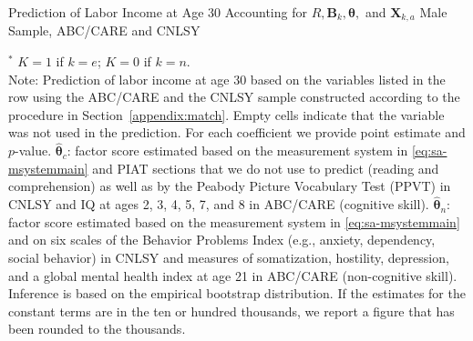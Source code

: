 \begin{table}
\begin{threeparttable}
\caption{Prediction of Labor Income at Age 30 Accounting for $R, \bm{B}_k, \bm{\theta},$ and $\bm{X}_{k,a}$ Male Sample, ABC/CARE and CNLSY}
\label{table:end2}
\centering
\scriptsize

\begin{tablenotes}
\footnotesize
\item $^\ast$ $K=1$ if $k=e$; $K=0$ if $k=n$.\\
Note: Prediction of labor income at age 30 based on the variables listed in the row using the ABC/CARE and the CNLSY sample constructed according to the procedure in Section~\ref{appendix:match}. Empty cells indicate that the variable was not used in the prediction. For each coefficient we provide point estimate and $p$-value. $\hat{\bm{\theta}}_{c}$: factor score estimated based on the measurement system in \eqref{eq:sa-msystemmain} and PIAT sections that we do not use to predict (reading and comprehension) as well as by the Peabody Picture Vocabulary Test (PPVT) in CNLSY and IQ at ages 2, 3, 4, 5, 7, and 8 in ABC/CARE (cognitive skill). $\hat{\bm{\theta}}_{n}$: factor score estimated based on the measurement system in \eqref{eq:sa-msystemmain} and on six scales of the Behavior Problems Index (e.g., anxiety, dependency, social behavior) in CNLSY and measures of somatization, hostility, depression, and a global mental health index at age 21 in ABC/CARE (non-cognitive skill). Inference is based on the empirical bootstrap distribution. If the estimates for the constant terms are in the ten or hundred thousands, we report a figure that has been rounded to the thousands.
\end{tablenotes}
\end{threeparttable}
\end{table}


